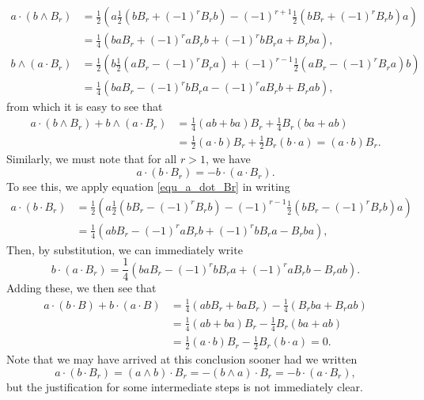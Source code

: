 \documentclass{birkjour}
\theoremstyle{definition}
\theoremstyle{remark}
\numberwithin{equation}{section}
\begin{document}
\begin{align*}
a\cdot(b\wedge B_r)
 &= \frac{1}{2}\left(a\frac{1}{2}\left(bB_r + (-1)^rB_rb\right)-(-1)^{r+1}\frac{1}{2}\left(bB_r+(-1)^rB_rb\right)a\right) \\
 &= \frac{1}{4}\left(baB_r + (-1)^raB_rb + (-1)^rbB_ra + B_rba\right), \\
b\wedge(a\cdot B_r)
 &= \frac{1}{2}\left(b\frac{1}{2}\left(aB_r-(-1)^rB_ra\right)+(-1)^{r-1}\frac{1}{2}\left(aB_r-(-1)^rB_ra\right)b\right) \\
 &= \frac{1}{4}\left(baB_r - (-1)^rbB_ra - (-1)^raB_rb + B_rab\right),
\end{align*}
from which it is easy to see that
\begin{align*}
a\cdot(b\wedge B_r)+b\wedge(a\cdot B_r) &= \frac{1}{4}(ab+ba)B_r + \frac{1}{4}B_r(ba+ab) \\
 &= \frac{1}{2}(a\cdot b)B_r + \frac{1}{2}B_r(b\cdot a) = (a\cdot b)B_r.
\end{align*}
Similarly, we must note that for all $r>1$, we have
\begin{equation}\label{equ_a_dot_b_dot_Br_identity}
a\cdot(b\cdot B_r) = -b\cdot(a\cdot B_r).
\end{equation}
To see this, we apply equation \eqref{equ_a_dot_Br} in writing
\begin{align*}
a\cdot(b\cdot B_r)
 &= \frac{1}{2}\left(a\frac{1}{2}\left(bB_r-(-1)^rB_rb\right)-(-1)^{r-1}\frac{1}{2}\left(bB_r-(-1)^rB_rb\right)a\right) \\
 &= \frac{1}{4}\left(abB_r - (-1)^raB_rb + (-1)^rbB_ra - B_rba\right),
\end{align*}
Then, by substitution, we can immediately write
\begin{equation*}
b\cdot(a\cdot B_r) = \frac{1}{4}\left(baB_r - (-1)^rbB_ra + (-1)^raB_rb - B_rab\right).
\end{equation*}
Adding these, we then see that
\begin{align*}
a\cdot (b\cdot B)+b\cdot(a\cdot B)
 &= \frac{1}{4}\left(abB_r+baB_r\right)-\frac{1}{4}\left(B_rba+B_rab\right) \\
 &= \frac{1}{4}\left(ab+ba\right)B_r-\frac{1}{4}B_r\left(ba+ab\right) \\
 &= \frac{1}{2}(a\cdot b)B_r - \frac{1}{2}B_r(b\cdot a) = 0.
\end{align*}
Note that we may have arrived at this conclusion sooner had we written
\begin{equation*}
a\cdot(b\cdot B_r) = (a\wedge b)\cdot B_r = -(b\wedge a)\cdot B_r = -b\cdot(a\cdot B_r),
\end{equation*}
but the justification for some intermediate steps is not immediately clear.
\end{document}
